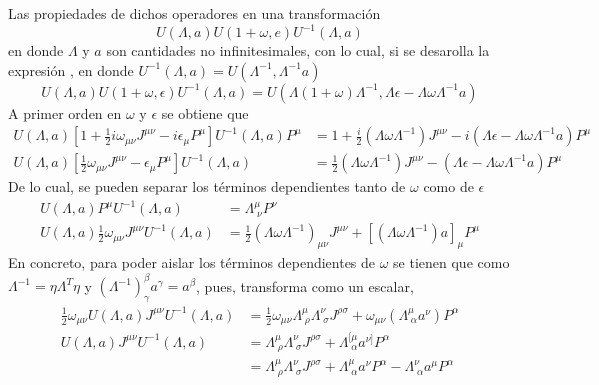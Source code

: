 \documentclass[12pt,letterpaper]{article}
\begin{document}
Las propiedades de dichos operadores en una transformación
\begin{equation}
  U(\Lambda,a) U(1+\omega,e) U^{-1}(\Lambda,a)
\end{equation}
en donde $\Lambda$ y $a$ son cantidades no infinitesimales, con lo cual, si se desarolla la expresión \cite{weinberg-v1}, en donde $U^{-1}(\Lambda,a) = U(\Lambda^{-1},\Lambda^{-1}a)$
\begin{equation}
  U(\Lambda,a)U(1+\omega,\epsilon)U^{-1}(\Lambda,a) = U(\Lambda(1+\omega)\Lambda^{-1},\Lambda \epsilon - \Lambda\omega\Lambda^{-1}a)
\end{equation}
A primer orden en $\omega$ y $\epsilon$ se obtiene que
\begin{align*}
  U(\Lambda,a) \left[ 1+\frac{1}{2}i\omega_{\mu\nu}J^{\mu\nu} - i\epsilon_\mu P^\mu \right]U^{-1}(\Lambda,a) P^\mu & = 1+ \frac{i}{2}\left( \Lambda \omega \Lambda^{-1} \right) J^{\mu\nu} - i(\Lambda \epsilon - \Lambda\omega\Lambda^{-1}a)P^\mu \\
  U(\Lambda,a) \left[ \frac{1}{2}\omega_{\mu\nu}J^{\mu\nu}-\epsilon_\mu P^\mu \right]U^{-1}(\Lambda,a) & = \frac{1}{2} \left( \Lambda \omega \Lambda^{-1} \right)J^{\mu\nu} - \left(\Lambda\epsilon- \Lambda\omega\Lambda^{-1}a \right)P^\mu
\end{align*}
De lo cual, se pueden separar los términos dependientes tanto de $\omega$ como de $\epsilon$
\begin{align}
  U(\Lambda,a)P^\mu U^{-1}(\Lambda,a) & = \Lambda^\mu_{\;\nu}P^\nu \\
  U(\Lambda,a)\frac{1}{2}\omega_{\mu\nu}J^{\mu\nu} U^{-1}(\Lambda,a) & = \frac{1}{2}\left( \Lambda\omega\Lambda^{-1} \right)_{\mu\nu} J^{\mu\nu} + \left[ \left(\Lambda\omega\Lambda^{-1}\right)a \right]_\mu P^\mu 
\end{align} 
En concreto, para poder aislar los términos dependientes de $\omega$ se tienen que como $\Lambda^{-1}=\eta \Lambda^T\eta$  y $(\Lambda^{-1})_\gamma^\beta a^\gamma=a^\beta$, pues, transforma como un escalar,
\begin{align*}
  \frac{1}{2}\omega_{\mu\nu} U(\Lambda,a) J^{\mu\nu} U^{-1}(\Lambda,a) & = \frac{1}{2}\omega_{\mu\nu}\Lambda^\mu_{\;\rho}\Lambda^\nu_{\;\sigma}J^{\rho\sigma} + \omega_{\mu\nu} \left( \Lambda^\mu_{\;\alpha}a^\nu \right)P^\alpha \\
  U(\Lambda,a)J^{\mu\nu}U^{-1}(\Lambda,a) & = \Lambda^\mu_{\;\rho}\Lambda^\nu_{\;\sigma}J^{\rho\sigma} + \Lambda^{[\mu}_{\;\alpha}a^{\nu]}P^\alpha \\
  & = \Lambda^\mu_{\;\rho}\Lambda^\nu_{\;\sigma} J^{\rho\sigma} + \Lambda^{\mu}_{\;\alpha}a^\nu P^\alpha - \Lambda^\nu_{\;\alpha}a^\mu P^\alpha
\end{align*}
\end{document}
